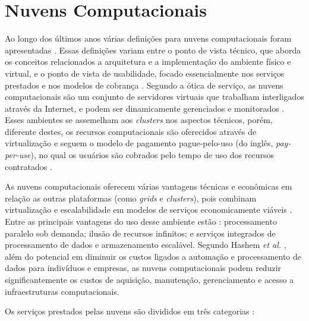 \section{Nuvens Computacionais}\label{sec2:cc}
Ao longo dos últimos anos várias definições para nuvens computacionais foram apresentadas \cite{Dikaiakos09, Armbrust10, Vaquero08}. Essas definições variam entre o ponto de vista técnico, que aborda os conceitos relacionados a arquitetura e a implementação do ambiente físico e virtual, e o ponto de vista de usabilidade, focado essencialmente nos serviços prestados e nos modelos de cobrança \cite{juve09}. Segundo a ótica de serviço, as nuvens computacionais são um conjunto de servidores virtuais que trabalham interligados através da Internet, e podem ser dinamicamente gerenciados e monitorados \cite{hoffa08}. Esses ambientes se assemelham aos \textit{clusters} nos aspectos técnicos, porém, diferente destes, os recursos computacionais são oferecidos através de virtualização e seguem o modelo de pagamento pague-pelo-uso (do inglês, \textit{pay-per-use}), no qual os usuários são cobrados pelo tempo de uso dos recursos contratados \cite{juve09}.  
 
As nuvens computacionais oferecem várias vantagens técnicas e econômicas em relação as outras plataformas (como \textit{grids} e \textit{clusters}), pois combinam virtualização e escalabilidade em modelos de serviços economicamente viáveis \cite{juve09}. Entre as principais vantagens do uso desse ambiente estão \cite{Hashem15}: processamento paralelo sob demanda; ilusão de recursos infinitos;  e serviços integrados de processamento de dados e armazenamento escalável. Segundo Hashem \textit{et al.} \cite{Hashem15}, além do potencial em diminuir os custos ligados a automação e processamento de dados para indivíduos e empresas, as nuvens computacionais podem reduzir significantemente os custos de aquisição, manutenção, gerenciamento e acesso a infraestruturas computacionais. 

Os serviços prestados pelas nuvens são divididos em três categorias \cite{Hashem15}:

